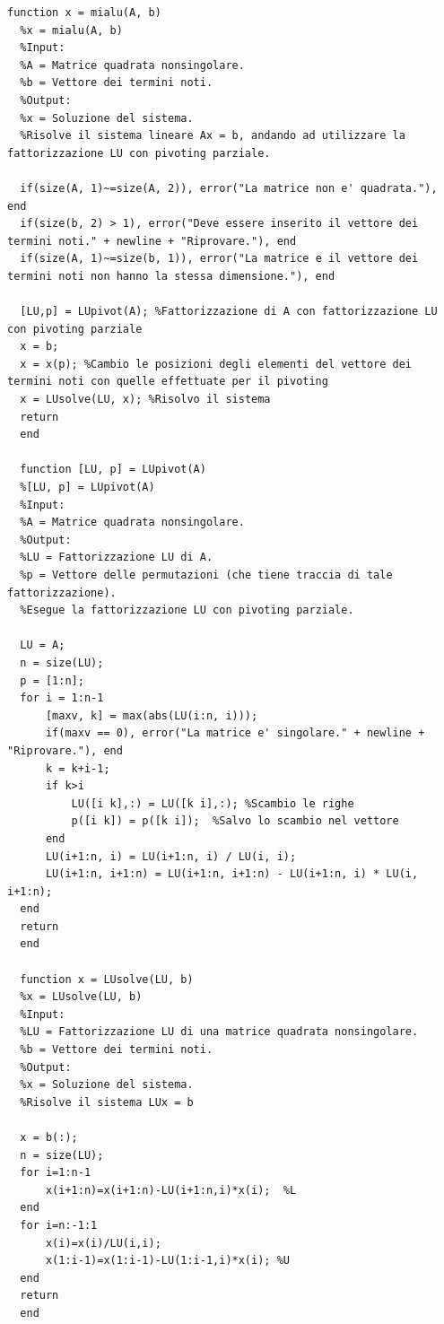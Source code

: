 \documentclass[10pt,a4paper]{article}
\begin{document}
\begin{lstlisting}[style=Matlab-editor]
  function x = mialu(A, b)
  %x = mialu(A, b)
  %Input:
  %A = Matrice quadrata nonsingolare.
  %b = Vettore dei termini noti.
  %Output:
  %x = Soluzione del sistema.
  %Risolve il sistema lineare Ax = b, andando ad utilizzare la fattorizzazione LU con pivoting parziale.
  
  if(size(A, 1)~=size(A, 2)), error("La matrice non e' quadrata."), end
  if(size(b, 2) > 1), error("Deve essere inserito il vettore dei termini noti." + newline + "Riprovare."), end
  if(size(A, 1)~=size(b, 1)), error("La matrice e il vettore dei termini noti non hanno la stessa dimensione."), end
  
  [LU,p] = LUpivot(A); %Fattorizzazione di A con fattorizzazione LU con pivoting parziale
  x = b;
  x = x(p); %Cambio le posizioni degli elementi del vettore dei termini noti con quelle effettuate per il pivoting
  x = LUsolve(LU, x); %Risolvo il sistema
  return
  end
  
  function [LU, p] = LUpivot(A)
  %[LU, p] = LUpivot(A)
  %Input:
  %A = Matrice quadrata nonsingolare.
  %Output:
  %LU = Fattorizzazione LU di A.
  %p = Vettore delle permutazioni (che tiene traccia di tale fattorizzazione).
  %Esegue la fattorizzazione LU con pivoting parziale.
  
  LU = A;
  n = size(LU);
  p = [1:n];
  for i = 1:n-1
      [maxv, k] = max(abs(LU(i:n, i)));
      if(maxv == 0), error("La matrice e' singolare." + newline + "Riprovare."), end
      k = k+i-1;
      if k>i
          LU([i k],:) = LU([k i],:); %Scambio le righe 
          p([i k]) = p([k i]);  %Salvo lo scambio nel vettore
      end
      LU(i+1:n, i) = LU(i+1:n, i) / LU(i, i);
      LU(i+1:n, i+1:n) = LU(i+1:n, i+1:n) - LU(i+1:n, i) * LU(i, i+1:n);
  end
  return
  end
  
  function x = LUsolve(LU, b)
  %x = LUsolve(LU, b)
  %Input:
  %LU = Fattorizzazione LU di una matrice quadrata nonsingolare.
  %b = Vettore dei termini noti.
  %Output:
  %x = Soluzione del sistema.
  %Risolve il sistema LUx = b
  
  x = b(:);
  n = size(LU);
  for i=1:n-1
      x(i+1:n)=x(i+1:n)-LU(i+1:n,i)*x(i);  %L
  end
  for i=n:-1:1
      x(i)=x(i)/LU(i,i);
      x(1:i-1)=x(1:i-1)-LU(1:i-1,i)*x(i); %U
  end
  return
  end
\end{lstlisting}
\end{document}
